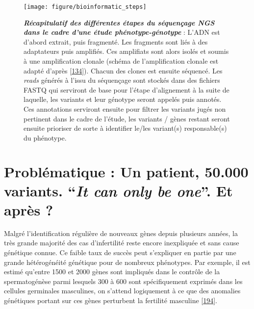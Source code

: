 \documentclass[12pt,a4paper,twoside]{ugathesis}
\theoremstyle{definition}
\theoremstyle{definition}
\theoremstyle{definition}
\theoremstyle{remark}
\begin{document}
\newpage 

\begin{figure}

{\centering \texttt{[image: figure/bioinformatic\_steps]} 

}

\caption[Récapitulatif des différentes étapes du séquençage NGS dans le cadre d'une étude phénotype-génotype]{\textbf{\emph{Récapitulatif des différentes
étapes du séquençage NGS dans le cadre d'une étude phénotype-génotype}}
: L'ADN est d'abord extrait, puis fragmenté. Les fragments sont liés à
des adaptateurs puis amplifiés. Ces amplifiats sont alors isolés et
soumis à une amplification clonale (schéma de l'amplification clonale
est adapté d'après {[}\protect\hyperlink{ref-Goodwin2016}{134}{]}).
Chacun des clones est ensuite séquencé. Les \emph{reads} générés à
l'issu du séquençage sont stockés dans des fichiers FASTQ qui serviront
de base pour l'étape d'alignement à la suite de laquelle, les variants
et leur génotype seront appelés puis annotés. Ces annotations serviront
ensuite pour filtrer les variants jugés non pertinent dans le cadre de
l'étude, les variants / gènes restant seront ensuite prioriser de sorte
à identifier le/les variant(s) responsable(s) du phénotype.}\label{fig:pictrecapngssteps}
\end{figure}















\newpage

\section{\texorpdfstring{Problématique : Un patient, 50.000 variants.
``\emph{It can only be one}''. Et après
?}{Problématique : Un patient, 50.000 variants. It can only be one. Et après ?}}\label{problematique-un-patient-50.000-variants.-it-can-only-be-one.-et-apres}

Malgré l'identification régulière de nouveaux gènes depuis plusieurs
années, la très grande majorité des cas d'infertilité reste encore
inexpliquée et sans cause génétique connue. Ce faible taux de succès
peut s'expliquer en partie par une grande hétérogénéité génétique pour
de nombreux phénotypes. Par exemple, il est estimé qu'entre 1500 et 2000
gènes sont impliqués dans le contrôle de la spermatogénèse parmi
lesquels 300 à 600 sont spécifiquement exprimés dans les cellules
germinales masculines, on s'attend logiquement à ce que des anomalies
génétiques portant sur ces gènes perturbent la fertilité masculine
{[}\protect\hyperlink{ref-Matzuk2008}{194}{]}.
\end{document}
